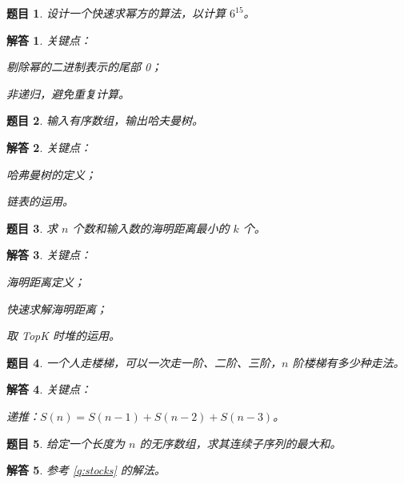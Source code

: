 \documentclass[UTF8, final]{ctexart}
\newtheorem{question}{题目}
\newtheorem{solution}{解答}
\begin{document}
\begin{question}
设计一个快速求幂方的算法，以计算 $6^{15}$。
\end{question}
\begin{solution}
关键点：
\begin{compactitem}
    \item 剔除幂的二进制表示的尾部 0；
    \item 非递归，避免重复计算。
\end{compactitem}

\end{solution}

\begin{question}
输入有序数组，输出哈夫曼树。
\end{question}
\begin{solution}
关键点：
\begin{compactitem}
    \item 哈弗曼树的定义；
    \item 链表的运用。
\end{compactitem}

\end{solution}

\begin{question}
求 $n$ 个数和输入数的海明距离最小的 $k$ 个。
\end{question}
\begin{solution}
关键点：
\begin{compactitem}
    \item 海明距离定义；
    \item 快速求解海明距离；
    \item 取 TopK 时堆的运用。
\end{compactitem}

\end{solution}

\begin{question}
一个人走楼梯，可以一次走一阶、二阶、三阶，$n$ 阶楼梯有多少种走法。
\end{question}
\begin{solution}
关键点：
\begin{compactitem}
    \item 递推：$S(n) = S(n - 1) + S(n - 2) + S(n - 3)$。
\end{compactitem}

\end{solution}

\begin{question}
给定一个长度为 $n$ 的无序数组，求其连续子序列的最大和。
\end{question}
\begin{solution}
参考 \ref{q:stocks} 的解法。
\end{solution}
\end{document}
